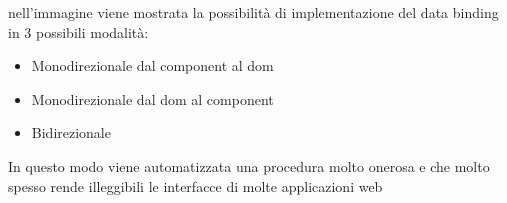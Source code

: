 nell'immagine viene mostrata la possibilità di implementazione del data binding in 3 possibili modalità:
\begin{itemize}
    \item Monodirezionale dal component al dom
    \item Monodirezionale dal dom al component
    \item Bidirezionale
\end{itemize}
In questo modo viene automatizzata una procedura molto onerosa e che molto spesso rende illeggibili le interfacce di molte applicazioni web